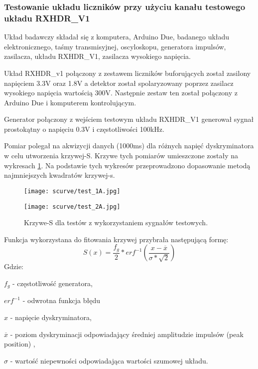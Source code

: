 \subsubsection{Testowanie układu liczników przy użyciu kanału testowego układu RXHDR\_V1}
\label{section RXHDR test}

Układ badawczy składał się z komputera, Arduino Due, badanego układu elektronicznego, taśmy transmisyjnej, oscyloskopu, generatora impulsów, zasilacza, układu RXHDR\_V1, zasilacza wysokiego napięcia. 

Układ RXHDR\_v1 połączony z zestawem liczników buforujących został zasilony napięciem 3.3V oraz 1.8V a detektor został spolaryzowany poprzez zasilacz wysokiego napięcia wartością 300V. Następnie zestaw ten został połączony z Arduino Due i komputerem kontrolującym. 

Generator połączony z wejściem testowym układu RXHDR\_V1 generował sygnał prostokątny o napięciu 0.3V i częstotliwości 100kHz. 

Pomiar polegał na akwizycji danych (1000ms) dla różnych napięć dyskryminatora w celu utworzenia krzywej-S. Krzywe tych pomiarów umieszczone zostały na wykresach \ref{s curve test}. Na podstawie tych wykresów przeprowadzono dopasowanie metodą najmniejszych kwadratów krzywej-s.

\begin{figure}
        \centering
        \begin{multicols}{2}
                \texttt{[image: scurve/test\_1A.jpg]} \par
                \texttt{[image: scurve/test\_2A.jpg]} \par
        \end{multicols}
        \caption{Krzywe-S dla testów z wykorzystaniem sygnałów testowych.}\label{s curve test}
\end{figure}

Funkcja wykorzystana do fitowania krzywej przybrała następującą formę:
\begin{equation}
        \label{test eq}
        S(x) = \frac{f_g}{2} * erf^{-1}(\frac{x-\overline{x}}{\sigma*\sqrt{2}})
\end{equation}
Gdzie:
\begin{description}
        \item $f_g$ - częstotliwość generatora,
        \item $erf^{-1}$ - odwrotna funkcja błędu
        \item $x$ - napięcie dyskryminatora,
        \item $\overline{x}$ - poziom dyskryminacji odpowiadający średniej amplitudzie impulsów (peak position) ,
        \item  $\sigma$ - wartość niepewności odpowiadająca wartości szumowej układu. 
\end{description}

